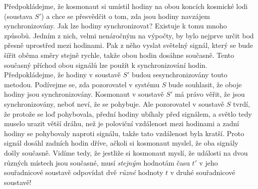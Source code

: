     Předpokládejme, že kosmonaut si umístil hodiny na obou koncích kosmické lodi (soustava \(S'\)) 
    a chce se přesvědčit o tom, zda jsou hodiny navzájem synchronizovány. Jak lze hodiny 
    synchronizovat? Existuje k tomu mnoho způsobů. Jedním z nich, velmi nenáročným na výpočty, by 
    bylo nejprve určit bod přesně uprostřed mezi hodinami. Pak z něho vyslat světelný signál, který 
    se bude šířit oběma směry stejně rychle, takže obou hodin dosáhne současně. Tento současný 
    příchod obou signálů lze použít k synchronizování hodin. Předpokládejme, že hodiny v soustavě 
    \(S'\) budou sesynchronizovány touto metodou. Podívejme se, zda pozorovatel v systému \(S\) 
    bude souhlasit, že oboje hodiny jsou synchronizovány. Kosmonaut v soustavě \(S'\) má právo 
    věřit, že jsou synchronizovány, neboť neví, že se pohybuje. Ale pozorovatel v soustavě \(S\) 
    tvrdí, že protože se loď pohybovala, přední hodiny ubíhaly před signálem, a světlo tedy muselo 
    urazit větší dráhu, než je poloviční vzdálenost mezi hodinami a zadní hodiny se pohybovaly 
    naproti signálu, takže tato vzdálenost byla kratší. Proto signál dosáhl zadních hodin dříve, 
    ačkoli si kosmonaut myslel, že oba signály došly současně. Vidíme tedy, že jestliže si 
    kosmonaut myslí, že události na dvou různých místech jsou současné, musí \emph{stejným} 
    hodnotám času \(t'\) v jeho souřadnicové soustavě odpovídat dvě \emph{různé} hodnoty \(t\) v 
    druhé souřadnicové soustavě!
    

